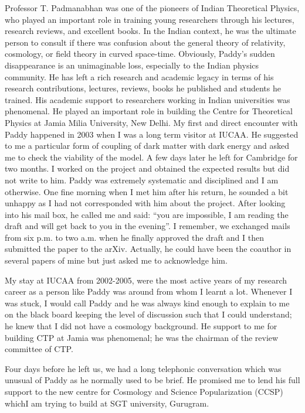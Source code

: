 \documentclass[prd, preprint, longbibliography, 11pt]{revtex4-1}
\begin{document}
\noindent Professor T. Padmanabhan was one of the pioneers of Indian Theoretical Physics, who  played an important role in training  young researchers through his lectures, research reviews, and excellent books. In the Indian context, he was the ultimate person to consult if there was confusion about the general theory of relativity, cosmology, or field theory in curved space-time. Obviously, Paddy’s sudden disappearance is an unimaginable loss, especially to the Indian physics community. He has left a rich research and academic legacy in terms of his research contributions, lectures, reviews, books he published and students he trained. His academic support to researchers working in Indian universities was phenomenal. He played an important role in building the Centre for Theoretical Physics at Jamia Milia University, New Delhi. My first and direct encounter with Paddy happened in 2003 when I was a long term visitor at IUCAA. He suggested to me a particular form of coupling of dark matter with dark energy and asked me to check the viability of the model. A few days later he left for Cambridge for two months. I worked on the project and obtained the expected results but did not write to him. Paddy was extremely systematic and disciplined and I am otherwise. One fine morning when I met him after his return, he sounded a bit unhappy as I had not corresponded with him about the project. After looking into his mail box, he called me and said: “you are impossible, I am reading the draft and will get back to you in the evening”. I remember, we exchanged mails from six p.m. to two a.m. when he finally approved the draft and I then submitted the paper to  the arXiv. Actually, he could have been the coauthor in several papers of mine but just asked me to acknowledge him.

    My stay at IUCAA from 2002-2005, were the most active years of my research career as a person like Paddy was around from whom I learnt a lot. Whenever I was stuck, I would call Paddy and he was always kind enough to explain to me on the black board keeping the level of discussion such that I could understand; he knew that I did not have a cosmology background. He support to me for building CTP at Jamia was phenomenal; he was  the chairman of the review committee of CTP. 
    
         Four days before he left us, we had a long telephonic conversation which was unusual of Paddy as he normally used to be brief. He promised me to lend his full support to the new centre for Cosmology and Science Popularization (CCSP) whichI am trying to build at SGT university, Gurugram. 
         
\end{document}
